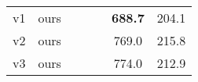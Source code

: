 \documentclass[letterpaper, 10 pt, conference]{ieeeconf}  \usepackage{geometry}
\begin{document}
\begin{table}[t]
{\begin{tabular}{ccccc|cc}
			v1                                                     & ours                                    & \checkmark                                                                                                       &                                                                                                          &                                                                                   & \textbf{688.7}                                                                    & 204.1                                                       \\
			v2                                                     & ours                                    & \checkmark                                                                                                       & \checkmark                                                                                                      &                                                                                   & 769.0                                                                             & 215.8                                                       \\
			v3                                                     & ours                                    & \checkmark                                                                                                       &                                                                                                          & \checkmark                                                                               & 774.0                                                                             & 212.9                                                       \\ \hline
		\end{tabular}
	}
	\label{Tb: Ablation-SI-resbn}


\end{table}
\end{document}
